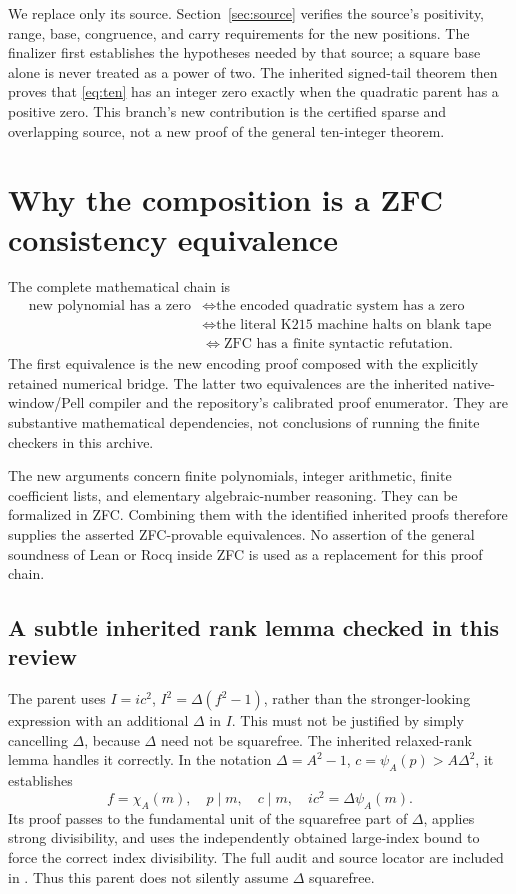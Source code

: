 \documentclass[11pt]{article}
\newcommand{\file}[1]{\texttt{\small\detokenize{#1}}}
\theoremstyle{definition}\newtheorem{definition}[theorem]{Definition}
\theoremstyle{remark}\newtheorem{remark}[theorem]{Remark}
\begin{document}
We replace only its source. Section~\ref{sec:source} verifies the source's
positivity, range, base, congruence, and carry requirements for the new
positions. The finalizer first establishes the hypotheses needed by that
source; a square base alone is never treated as a power of two.
The inherited signed-tail theorem then proves that \eqref{eq:ten} has an
integer zero exactly when the quadratic parent has a positive zero.
This branch's new contribution is the certified sparse and overlapping
source, not a new proof of the general ten-integer theorem.

\section{Why the composition is a ZFC consistency equivalence}
\label{sec:foundations}
The complete mathematical chain is
\begin{align*}
 \text{new polynomial has a zero}
 &\Longleftrightarrow \text{the encoded quadratic system has a zero}\\
 &\Longleftrightarrow \text{the literal K215 machine halts on blank tape}\\
 &\Longleftrightarrow \text{ZFC has a finite syntactic refutation}.
\end{align*}
The first equivalence is the new encoding proof composed with the explicitly
retained numerical bridge. The latter two equivalences are the inherited
native-window/Pell compiler and the repository's calibrated proof enumerator.
They are substantive mathematical dependencies, not conclusions of running
the finite checkers in this archive.

The new arguments concern finite polynomials, integer arithmetic, finite
coefficient lists, and elementary algebraic-number reasoning. They can be
formalized in ZFC. Combining them with the identified inherited proofs
therefore supplies the asserted ZFC-provable equivalences. No assertion of
the general soundness of Lean or Rocq inside ZFC is used as a replacement
for this proof chain.

\subsection{A subtle inherited rank lemma checked in this review}
The parent uses
$I=ic^2$, $I^2=\Delta(f^2-1)$, rather than the stronger-looking expression
with an additional $\Delta$ in $I$. This must not be justified by simply
cancelling $\Delta$, because $\Delta$ need not be squarefree.
The inherited relaxed-rank lemma handles it correctly. In the notation
$\Delta=A^2-1$, $c=\psi_A(p)>A\Delta^2$, it establishes
\[
 f=\chi_A(m),\quad p\mid m,\quad c\mid m,\quad
 ic^2=\Delta\psi_A(m).
\]
Its proof passes to the fundamental unit of the squarefree part of
$\Delta$, applies strong divisibility, and uses the independently obtained
large-index bound to force the correct index divisibility. The full audit
and source locator are included in \file{proofs/FOUNDATION_AUDIT.md}.
Thus this parent does not silently assume $\Delta$ squarefree.
\end{document}
